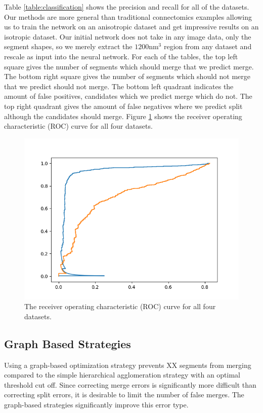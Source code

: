 Table \ref{table:classification} shows the precision and recall for all of the datasets. Our methods are more general than traditional connectomics examples allowing us to train the network on an anisotropic dataset and get impressive results on an isotropic dataset. Our initial network does not take in any image data, only the segment shapes, so we merely extract the $1200 \textrm{nm}^3$ region from any dataset and rescale as input into the neural network. For each of the tables, the top left square gives the number of segments which should merge that we predict merge. The bottom right square gives the number of segments which should not merge that we predict should not merge. The bottom left quadrant indicates the amount of false positives, candidates which we predict merge which do not. The top right quadrant gives the amount of false negatives where we predict split although the candidates should merge. Figure \ref{fig:network-results} shows the receiver operating characteristic (ROC) curve for all four datasets. 

\begin{figure}
	\includegraphics[width=0.9\linewidth]{./figures/roc-microns-300-test.png}
	\caption{The receiver operating characteristic (ROC) curve for all four datasets.}
	\label{fig:network-results}
\end{figure}

\subsection{Graph Based Strategies}

Using a graph-based optimization strategy prevents XX segments from merging compared to the simple hierarchical agglomeration strategy with an optimal threshold cut off. Since correcting merge errors is significantly more difficult than correcting split errors, it is desirable to limit the number of false merges. The graph-based strategies significantly improve this error type. 

